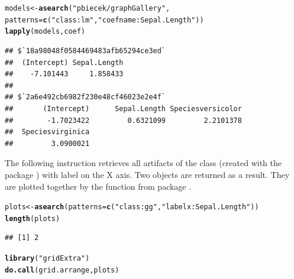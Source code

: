 \documentclass[nojss]{jss}\usepackage[]{graphicx}\usepackage[]{color}
\makeatletter
\newcommand{\hlstr}[1]{\textcolor[rgb]{0.192,0.494,0.8}{#1}}%
\newcommand{\hlstd}[1]{\textcolor[rgb]{0.345,0.345,0.345}{#1}}%
\newcommand{\hlkwb}[1]{\textcolor[rgb]{0.69,0.353,0.396}{#1}}%
\newcommand{\hlkwc}[1]{\textcolor[rgb]{0.333,0.667,0.333}{#1}}%
\newcommand{\hlkwd}[1]{\textcolor[rgb]{0.737,0.353,0.396}{\textbf{#1}}}%
\newenvironment{kframe}{%
 \def\at@end@of@kframe{}%
 \ifinner\ifhmode%
  \def\at@end@of@kframe{\end{minipage}}%
  \begin{minipage}{\columnwidth}%
 \fi\fi%
 \def\FrameCommand##1{\hskip\@totalleftmargin \hskip-\fboxsep
 \colorbox{shadecolor}{##1}\hskip-\fboxsep
     \hskip-\linewidth \hskip-\@totalleftmargin \hskip\columnwidth}%
 \MakeFramed {\advance\hsize-\width
   \@totalleftmargin\z@ \linewidth\hsize
   \@setminipage}}%
 {\par\unskip\endMakeFramed%
 \at@end@of@kframe}
\newenvironment{knitrout}{}{} %
\makeatother
\begin{document}
\begin{knitrout}
\color{fgcolor}\begin{kframe}
\begin{alltt}
\hlstd{models} \hlkwb{<-} \hlkwd{asearch}\hlstd{(}\hlstr{"pbiecek/graphGallery"}\hlstd{,}
    \hlkwc{patterns} \hlstd{=} \hlkwd{c}\hlstd{(}\hlstr{"class:lm"}\hlstd{,} \hlstr{"coefname:Sepal.Length"}\hlstd{))}
\hlkwd{lapply}\hlstd{(models, coef)}
\end{alltt}
\begin{verbatim}
## $`18a98048f0584469483afb65294ce3ed`
##  (Intercept) Sepal.Length 
##    -7.101443     1.858433 
## 
## $`2a6e492cb6982f230e48cf46023e2e4f`
##       (Intercept)      Sepal.Length Speciesversicolor 
##        -1.7023422         0.6321099         2.2101378 
##  Speciesvirginica 
##         3.0900021
\end{verbatim}
\end{kframe}
\end{knitrout}

The following instruction retrieves all artifacts of the  class (created with the package ) with label  on the X axis. Two objects are returned as a result. They are plotted together by the  function from  package \citep[see][]{gridExtra}.

\begin{knitrout}
\color{fgcolor}\begin{kframe}
\begin{alltt}
\hlstd{plots} \hlkwb{<-} \hlkwd{asearch}\hlstd{(}\hlkwc{patterns} \hlstd{=} \hlkwd{c}\hlstd{(}\hlstr{"class:gg"}\hlstd{,} \hlstr{"labelx:Sepal.Length"}\hlstd{))}
\hlkwd{length}\hlstd{(plots)}
\end{alltt}
\begin{verbatim}
## [1] 2
\end{verbatim}
\end{kframe}
\end{knitrout}

\begin{knitrout}
\color{fgcolor}\begin{kframe}
\begin{alltt}
\hlkwd{library}\hlstd{(}\hlstr{"gridExtra"}\hlstd{)}
\hlkwd{do.call}\hlstd{(grid.arrange, plots)}
\end{alltt}
\end{kframe}
\end{knitrout}
\end{document}
